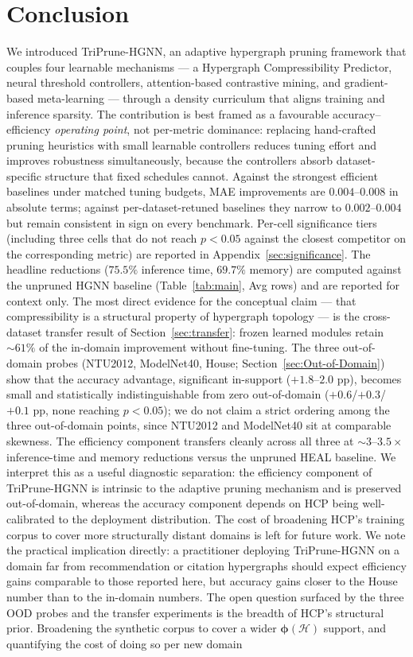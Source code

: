 \documentclass[10pt]{article}
\theoremstyle{plain}
\theoremstyle{definition}
\begin{document}
\section{Conclusion}
We introduced TriPrune-HGNN, an adaptive hypergraph pruning framework that couples four learnable mechanisms --- a Hypergraph Compressibility Predictor, neural threshold controllers, attention-based contrastive mining, and gradient-based meta-learning --- through a density curriculum that aligns training and inference sparsity. The contribution is best framed as a favourable accuracy--efficiency \emph{operating point}, not per-metric dominance: replacing hand-crafted pruning heuristics with small learnable controllers reduces tuning effort and improves robustness simultaneously, because the controllers absorb dataset-specific structure that fixed schedules cannot. Against the strongest efficient baselines under matched tuning budgets, MAE improvements are $0.004$--$0.008$ in absolute terms; against per-dataset-retuned baselines they narrow to $0.002$--$0.004$ but remain consistent in sign on every benchmark. Per-cell significance tiers (including three cells that do not reach $p<0.05$ against the closest competitor on the corresponding metric) are reported in Appendix~\ref{sec:significance}. The headline reductions ($75.5\%$ inference time, $69.7\%$ memory) are computed against the unpruned HGNN baseline (Table~\ref{tab:main}, Avg rows) and are reported for context only. The most direct evidence for the conceptual claim --- that compressibility is a structural property of hypergraph topology --- is the cross-dataset transfer result of Section~\ref{sec:transfer}: frozen learned modules retain $\sim\!61\%$ of the in-domain improvement without fine-tuning. The three out-of-domain probes (NTU2012, ModelNet40, House; Section~\ref{sec:Out-of-Domain}) show that the accuracy advantage, significant in-support ($+1.8$--$2.0$ pp), becomes small and statistically indistinguishable from zero out-of-domain ($+0.6$/$+0.3$/$+0.1$ pp, none reaching $p<0.05$); we do not claim a strict ordering among the three out-of-domain points, since NTU2012 and ModelNet40 sit at comparable skewness. The efficiency component transfers cleanly across all three at $\sim\!3$--$3.5\times$ inference-time and memory reductions versus the unpruned HEAL baseline. We interpret this as a useful diagnostic separation: the efficiency component of TriPrune-HGNN is intrinsic to the adaptive pruning mechanism and is preserved out-of-domain, whereas the accuracy component depends on HCP being well-calibrated to the deployment distribution. The cost of broadening HCP's training corpus to cover more structurally distant domains is left for future work. We note the practical implication directly: a practitioner deploying TriPrune-HGNN on a domain far from recommendation or citation hypergraphs should expect efficiency gains comparable to those reported here, but accuracy gains closer to the House number than to the in-domain numbers. The open question surfaced by the three OOD probes and the transfer experiments is the breadth of HCP's structural prior. Broadening the synthetic corpus to cover a wider $\boldsymbol{\phi}(\mathcal{H})$ support, and quantifying the cost of doing so per new domain 
\end{document}
